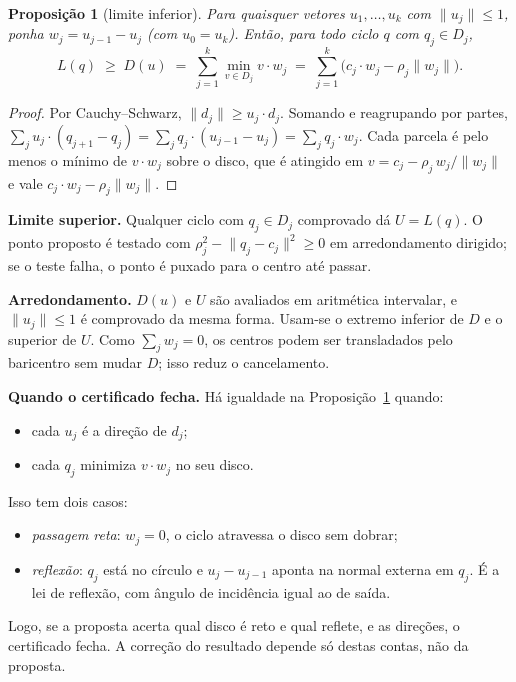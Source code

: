 \documentclass[11pt]{article}
\theoremstyle{plain}
\newtheorem{proposicao}{Proposição}
\theoremstyle{remark}
\newcommand{\sect}[1]{\par\bigskip{\color{navy}\large\bfseries #1\par}\smallskip}
\begin{document}
\sect{1. O certificado}

\begin{proposicao}[limite inferior]\label{prop:dual}
Para quaisquer vetores $u_1,\dots,u_k$ com $\lVert u_j\rVert\le1$, ponha
$w_j=u_{j-1}-u_j$ (com $u_0=u_k$). Então, para todo ciclo $q$ com $q_j\in D_j$,
\[
  L(q)\;\ge\;D(u)\;=\;\sum_{j=1}^{k}\min_{v\in D_j} v\cdot w_j
       \;=\;\sum_{j=1}^{k}\bigl(c_j\cdot w_j-\rho_j\lVert w_j\rVert\bigr).
\]
\end{proposicao}
\begin{proof}
Por Cauchy--Schwarz, $\lVert d_j\rVert\ge u_j\cdot d_j$. Somando e reagrupando por
partes, $\sum_j u_j\cdot(q_{j+1}-q_j)=\sum_j q_j\cdot(u_{j-1}-u_j)=\sum_j q_j\cdot w_j$.
Cada parcela é pelo menos o mínimo de $v\cdot w_j$ sobre o disco, que é atingido em
$v=c_j-\rho_j\,w_j/\lVert w_j\rVert$ e vale $c_j\cdot w_j-\rho_j\lVert w_j\rVert$.
\end{proof}

\textbf{Limite superior.} Qualquer ciclo com $q_j\in D_j$ comprovado dá
$U=L(q)$. O ponto proposto é testado com $\rho_j^2-\lVert q_j-c_j\rVert^2\ge0$ em
arredondamento dirigido; se o teste falha, o ponto é puxado para o centro até passar.

\textbf{Arredondamento.} $D(u)$ e $U$ são avaliados em aritmética intervalar, e
$\lVert u_j\rVert\le1$ é comprovado da mesma forma. Usam-se o extremo inferior de $D$ e o
superior de $U$. Como $\sum_j w_j=0$, os centros podem ser transladados pelo baricentro sem
mudar $D$; isso reduz o cancelamento.

\textbf{Quando o certificado fecha.} Há igualdade na Proposição~\ref{prop:dual} quando:
\begin{itemize}
  \item cada $u_j$ é a direção de $d_j$;
  \item cada $q_j$ minimiza $v\cdot w_j$ no seu disco.
\end{itemize}
Isso tem dois casos:
\begin{itemize}
  \item \emph{passagem reta}: $w_j=0$, o ciclo atravessa o disco sem dobrar;
  \item \emph{reflexão}: $q_j$ está no círculo e $u_j-u_{j-1}$ aponta na normal externa
    em $q_j$. É a lei de reflexão, com ângulo de incidência igual ao de saída.
\end{itemize}
Logo, se a proposta acerta qual disco é reto e qual reflete, e as direções, o certificado
fecha. A correção do resultado depende só destas contas, não da proposta.
\end{document}
